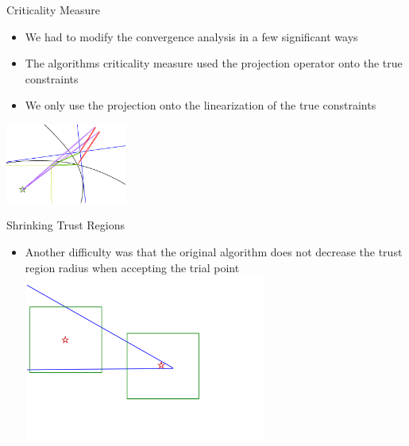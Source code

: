 \documentclass{beamer}
\begin{document}
\begin{frame}{Criticality Measure}
	\begin{itemize}
		\item We had to modify the convergence analysis in a few significant ways
		\item The algorithms criticality measure used the projection operator onto the true constraints
		\item We only use the projection onto the linearization of the true constraints
	\end{itemize}

	\begin{center}
		\includegraphics[width=150px]{images/criticality_measure.png}
	\end{center}
\end{frame}

\begin{frame}{Shrinking Trust Regions}

\begin{itemize}
    \item Another difficulty was that the original algorithm does not decrease the trust region radius when accepting the trial point
    \includegraphics[width=300px]{images/decrease_required.png}
\end{itemize}
\end{frame}
\end{document}
